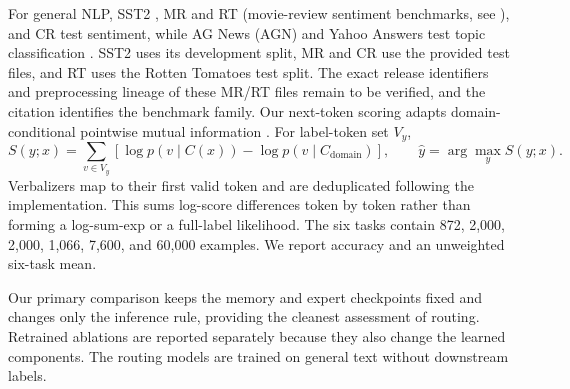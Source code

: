 \documentclass{article}
\begin{document}
For general NLP, SST2 \citep{socher2013recursive}, MR and RT (movie-review sentiment benchmarks, see \citealp{pang2005seeing}), and CR \citep{hu2004mining} test sentiment, while AG News (AGN) and Yahoo Answers test topic classification \citep{zhang2015character}. SST2 uses its development split, MR and CR use the provided test files, and RT uses the Rotten Tomatoes test split. The exact release identifiers and preprocessing lineage of these MR/RT files remain to be verified, and the citation identifies the benchmark family. Our next-token scoring adapts domain-conditional pointwise mutual information \citep{holtzman2021surface}. For label-token set $V_y$,
\begin{equation}
 S(y;x)=\sum_{v\in V_y}
       [\log p(v\mid C(x))-\log p(v\mid C_{\mathrm{domain}})],
 \qquad \widehat y=\arg\max_y S(y;x).
 \label{eq:dcpmi}
\end{equation}
Verbalizers map to their first valid token and are deduplicated following the implementation. This sums log-score differences token by token rather than forming a log-sum-exp or a full-label likelihood. The six tasks contain 872, 2,000, 2,000, 1,066, 7,600, and 60,000 examples. We report accuracy and an unweighted six-task mean.

Our primary comparison keeps the memory and expert checkpoints fixed and changes
only the inference rule, providing the cleanest assessment of routing.
Retrained ablations are reported separately because they also change the learned
components. The routing models are trained on general text without downstream
labels.



\end{document}
